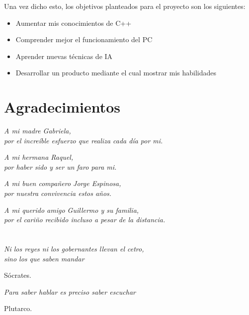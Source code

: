 Una vez dicho esto, los objetivos planteados para el proyecto son los siguientes:
\begin{itemize}
	\item Aumentar mis conocimientos de C++
	\item Comprender mejor el funcionamiento del \ac{PC}
	\item Aprender nuevas técnicas de \ac{IA}
	\item Desarrollar un producto mediante el cual mostrar mis habilidades
\end{itemize}

\cleardoublepage %
\chapter*{Agradecimientos}
\setlength{\leftmargin}{0.5\textwidth}
\setlength{\parsep}{0cm}
\addtolength{\topsep}{0.5cm}
\begin{flushright}
\small\em{
A mi madre Gabriela,\\
por el increíble esfuerzo que realiza cada día por mi. 
}
\end{flushright}
\begin{flushright}
\small\em{
A mi hermana Raquel,\\
por haber sido y ser un faro para mi. 
}
\end{flushright}
\begin{flushright}
\small\em{
A mi buen compañero Jorge Espinosa,\\
por nuestra convivencia estos años. 
}
\end{flushright}
\begin{flushright}
\small\em{
A mi querido amigo Guillermo y su familia,\\
por el cariño recibido incluso a pesar de la distancia. 
}
\end{flushright}

\cleardoublepage %
\chapter*{}
\setlength{\leftmargin}{0.5\textwidth}
\setlength{\parsep}{0cm}
\addtolength{\topsep}{0.5cm}
\begin{flushright}
\small\em{
Ni los reyes ni los gobernantes llevan el cetro,\\
sino los que saben mandar\\ 
}
\end{flushright}
\begin{flushright}
\small{
Sócrates.
}
\end{flushright}

\begin{flushright}
\small\em{
Para saber hablar es preciso saber escuchar\\
}
\end{flushright}
\begin{flushright}
\small{
Plutarco.
}
\end{flushright}
\cleardoublepage %
